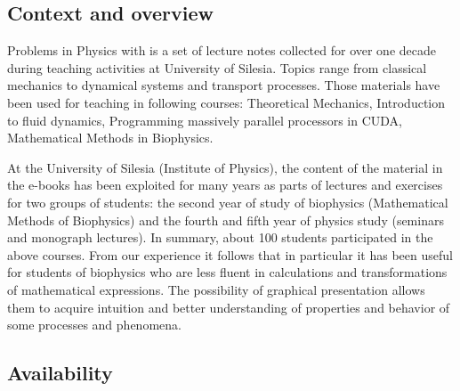 \documentclass{deliverablereport}
\begin{document}
\subsection{Context and overview}

Problems in Physics with \SageMath is a set of lecture notes collected for
over one decade during teaching activities at University of
Silesia. Topics range from classical mechanics to dynamical systems
and transport processes. Those materials have been used for teaching
in following courses: Theoretical Mechanics, Introduction to fluid
dynamics, Programming massively parallel processors in CUDA,
Mathematical Methods in Biophysics.


At the University of Silesia (Institute of Physics), the content of
the material in the e-books has been exploited for many years as parts
of lectures and exercises for two groups of students: the second year
of study of biophysics (Mathematical Methods of Biophysics) and the
fourth and fifth year of physics study (seminars and monograph
lectures). In summary, about 100 students participated in the above
courses. From our experience it follows that in particular it has been
useful for students of biophysics who are less fluent in calculations
and transformations of mathematical expressions. The possibility of
graphical presentation allows them to acquire intuition and better
understanding of properties and behavior of some processes and
phenomena.

\subsection{Availability}
\end{document}
